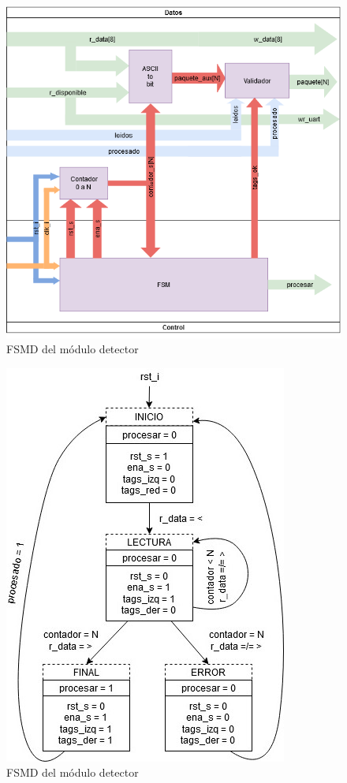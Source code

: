 		\begin{figure}[h]
		\centering
			\includegraphics[scale=.7]{./Figures/FSMD-Detector}
			\caption{FSMD del módulo detector}
			\label{fig:FSMD_Detector}
		\end{figure}
		
		\begin{figure}[h]
		\centering
			\includegraphics[scale=.8,angle = 0]{./Figures/Estados_Detector}
			\caption{FSMD del módulo detector}
			\label{fig:Estados_Detector}
		\end{figure}
		
